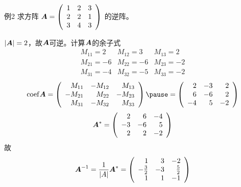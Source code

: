 \begin{frame}
  \begin{footnotesize}
    \begin{exampleblock}{例2}
      求方阵
      $
      \boldsymbol{A} = \left(
      \begin{array}{ccc}
        1 & 2 & 3\\
        2 & 2 & 1\\
        3 & 4 & 3
      \end{array}
      \right)
      $
      的逆阵。
    \end{exampleblock}
    \jiename
    $|\boldsymbol{A}| = 2$，故$\boldsymbol{A}$可逆。\pause 计算$\boldsymbol{A}$的余子式
    $$
    \begin{array}{lll}
      M_{11}=2 & M_{12}=3 & M_{13}=2\\
      M_{21}=-6 & M_{22}=-6 & M_{23}=-2\\
      M_{31}=-4 & M_{32}=-5 & M_{33}=-2
    \end{array}
    $$
    \pause 
    $$
    \mathrm{coef} \A = \left(
    \begin{array}{rrr}
      M_{11} & -M_{12} &  M_{13}\\
     -M_{21} &  M_{22} & -M_{23}\\
      M_{31} & -M_{32} &  M_{33}
    \end{array}
    \right) \pause = \left(
    \begin{array}{rrr}
      2 & -3 &  2\\
      6 & -6 &  2 \\
      -4 & 5 & -2
    \end{array}
    \right)
    $$
    \pause 
    $$
    \boldsymbol{A}^* =  \left(
    \begin{array}{rrr}
      2 & 6 &  -4\\
      -3 & -6 & 5 \\
      2 & 2 & -2
    \end{array}
    \right)
    $$
    \pause 
    故
    $$
    \boldsymbol{A}^{-1} = \frac1{|A|}\boldsymbol{A}^* = \left(
    \begin{array}{rrr}
      1 & 3 &  -2\\
      -\frac32 & -3 & \frac52 \\
      1 & 1 & -1
    \end{array}
    \right)
    $$
  \end{footnotesize}
\end{frame}



